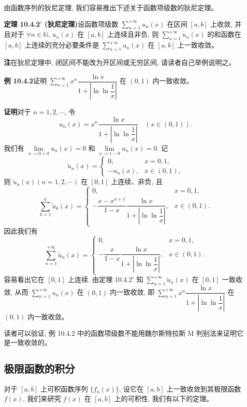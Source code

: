 \documentclass[UTF8, 12pt, fontset=fandol, oneside]{ctexart}
\begin{document}
由函数序列的狄尼定理, 我们容易推出下述关于函数项级数的狄尼定理。

\noindent\textbf{定理 10.4.2$'$ (狄尼定理)}\quad 设函数项级数 $\sum\limits_{n=1}^{+\infty}u_n(x)$ 在区间 $[a,b]$ 上收敛, 并且对于 $\forall n\in\mathbb N$, $u_n(x)$ 在 $[a,b]$ 上连续且非负, 则 $\sum\limits_{n=1}^{+\infty}u_n(x)$ 的和函数在 $[a,b]$ 上连续的充分必要条件是 $\sum\limits_{n=1}^{+\infty}u_n(x)$ 在 $[a,b]$ 上一致收敛。

\noindent\textbf{注}\quad 在狄尼定理中, 闭区间不能改为开区间或无穷区间, 请读者自己举例说明之。

\noindent\textbf{例 10.4.2}\quad 证明 $\sum\limits_{n=1}^{+\infty}x^n\dfrac{\ln x}{1+\left|\ln\ln\dfrac1x\right|}$ 在 $(0,1)$ 内一致收敛。

\noindent\textbf{证明}\quad 对于 $n=1,2,\cdots$, 令
\[
  u_n(x)=x^n\frac{\ln x}{1+\left|\ln\ln\dfrac1x\right|}\quad(x\in(0,1)).
\]
我们有 $\lim\limits_{x\to0+0}u_n(x)=0$ 和 $\lim\limits_{x\to1-0}u_n(x)=0$. 记
\[
  \widetilde u_n(x)=
  \begin{cases}
    0, & x=0,1,\\
    -u_n(x), & x\in(0,1),
  \end{cases}
\]
则 $\widetilde u_n(x)(n=1,2,\cdots)$ 在 $[0,1]$ 上连续、非负, 且
\[
  \sum_{k=1}^n\widetilde u_k(x)=
  \begin{cases}
    0, & x=0,1,\\
    -\dfrac{x-x^{n+1}}{1-x}\dfrac{\ln x}{1+\left|\ln\ln\dfrac1x\right|}, & x\in(0,1).
  \end{cases}
\]
因此我们有
\[
  \sum_{n=1}^{+\infty}\widetilde u_n(x)=
  \begin{cases}
    0, & x=0,1,\\
    -\dfrac{x}{1-x}\dfrac{\ln x}{1+\left|\ln\ln\dfrac1x\right|}, & x\in(0,1).
  \end{cases}
\]
容易看出它在 $[0,1]$ 上连续. 由定理 10.4.2$'$ 知 $\sum\limits_{n=1}^{+\infty}\widetilde u_n(x)$ 在 $[0,1]$ 一致收敛, 从而 $\sum\limits_{n=1}^{+\infty}u_n(x)$ 在 $(0,1)$ 内一致收敛, 即 $\sum\limits_{n=1}^{+\infty}x^n\dfrac{\ln x}{1+\left|\ln\ln\dfrac1x\right|}$ 在 $(0,1)$ 内一致收敛。

读者可以验证, 例 10.4.2 中的函数项级数不能用魏尔斯特拉斯 M 判别法来证明它是一致收敛的。

\subsection{极限函数的积分}

对于 $[a,b]$ 上可积函数序列 $\{f_n(x)\}$, 设它在 $[a,b]$ 上一致收敛到其极限函数 $f(x)$, 我们来研究 $f(x)$ 在 $[a,b]$ 上的可积性. 我们有以下的定理。
\end{document}
